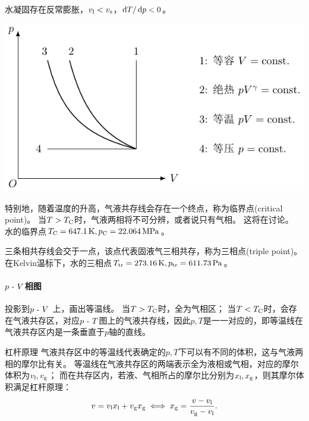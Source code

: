 \begin{remark}
	水凝固存在反常膨胀，$v_{\mathrm{l}}<v_{\mathrm{s}}$，$\mathop{}\!\mathrm{d} T/\mathop{}\!\mathrm{d} p<0$。
\end{remark}

\begin{center}
	\includegraphics[page=9]{figures/tikz/coordinates.pdf}
	\label{fig:H2O phase P-T}
\end{center}

特别地，随着温度的升高，气液共存线会存在一个终点，称为临界点(critical point)。
当$T>T_\mathrm C$时，气液两相将不可分辨，或者说只有气相。
这将在讨论。
水的临界点$T_\mathrm C=\SI{647.1}{K},p_\mathrm C=\SI{22.064}{MPa}$。

三条相共存线会交于一点，该点代表固液气三相共存，称为三相点(triple point)。
在Kelvin温标下，水的三相点$T_\mathrm{tr}=\SI{273.16}{K},p_\mathrm{tr}=\SI{611.73}{Pa}$。

\paragraph{$p~\text{-}~ V$相图}

投影到$p~\text{-}~ V$ 上，画出等温线。
当$T>T_\mathrm C$时，全为气相区；
当$T<T_\mathrm C$时，会存在气液共存区，对应$p~\text{-}~ T$图上的气液共存线，因此$p,T$是一一对应的，即等温线在气液共存区内是一条垂直于$p$轴的直线。

\begin{example}
	{杠杆原理}{}
	气液共存区中的等温线代表确定的$p,T$下可以有不同的体积，这与气液两相的摩尔比有关。
	等温线在气液共存区的两端表示全为液相或气相，对应的摩尔体积为$v_{\mathrm{l}},v_{\mathrm{g}}$；
	而在共存区内，若液、气相所占的摩尔比分别为$x_{\mathrm{l}},x_{\mathrm{g}}$，则其摩尔体积满足杠杆原理：
	\[
		v=v_{\mathrm{l}} x_{\mathrm{l}}+v_{\mathrm{g}} x_{\mathrm{g}}\iff x_{\mathrm{g}}=\frac{v-v_{\mathrm{l}}}{v_{\mathrm{g}}-v_{\mathrm{l}}}.
	\]
\end{example}

